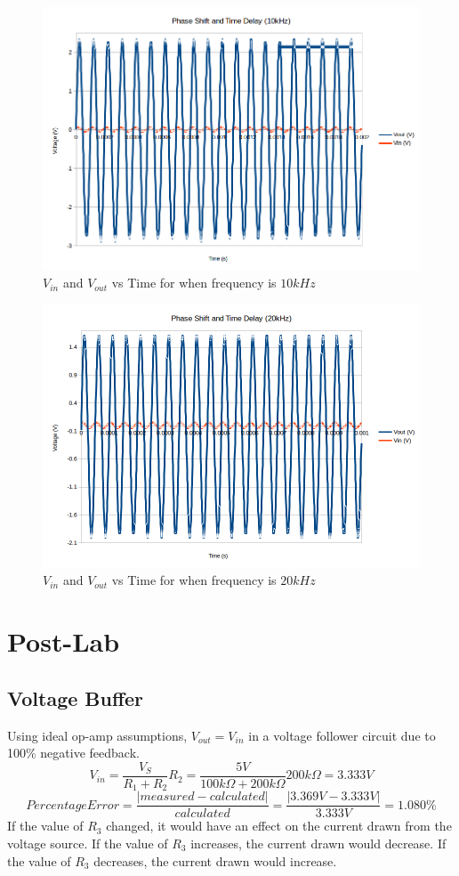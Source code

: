 \documentclass[10pt]{article}
\begin{document}
\begin{figure}[H]
	\centering
	\includegraphics[width=\textwidth]{PhaseShift10.png}
	\caption{$V_{in}$ and $V_{out}$ vs Time for when frequency is $10kHz$}
\end{figure}
\begin{figure}[H]
	\centering
	\includegraphics[width=\textwidth]{PhaseShift20.png}
	\caption{$V_{in}$ and $V_{out}$ vs Time for when frequency is $20kHz$}
\end{figure}

\section*{Post-Lab}
\subsection*{Voltage Buffer}
\noindent Using ideal op-amp assumptions, $V_{out} = V_{in}$ in a voltage follower circuit due to 100\% negative feedback.
$$V_{in} = \frac{V_S}{R_1 + R_2} R_2 = \frac{5V}{100k\Omega + 200k\Omega}200k\Omega = 3.333V$$
$$Percentage Error = \frac{|measured-calculated|}{calculated} = \frac{|3.369V-3.333V|}{3.333V} = 1.080\%$$
\noindent If the value of $R_3$ changed, it would have an effect on the current drawn from the voltage source. If the value of $R_3$ increases, the current drawn would decrease. If the value of $R_3$ decreases, the current drawn would increase.
\end{document}
